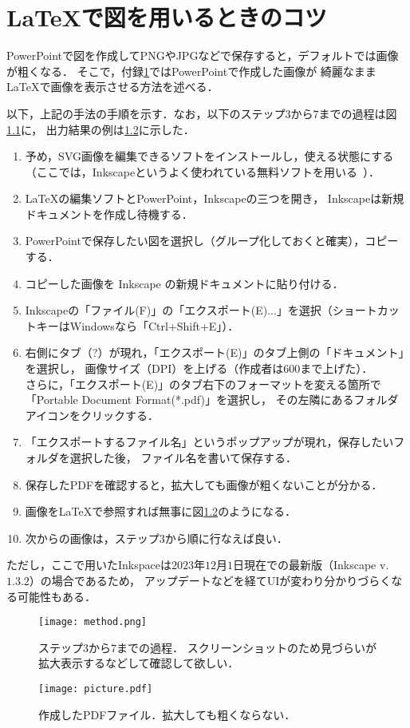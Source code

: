 \chapter{\LaTeX で図を用いるときのコツ} \label{apdx:tips}
PowerPointで図を作成してPNGやJPGなどで保存すると，デフォルトでは画像が粗くなる．
そこで，付録\ref{apdx:tips}ではPowerPointで作成した画像が
綺麗なまま\LaTeX で画像を表示させる方法を述べる．

以下，上記の手法の手順を示す．なお，以下のステップ$3$から$7$までの過程は図\ref{fig:method}に，
出力結果の例は\ref{fig:pdf}に示した．
\begin{enumerate}
    \item 予め，SVG画像を編集できるソフトをインストールし，使える状態にする
        （ここでは，Inkscapeというよく使われている無料ソフトを用いる~\cite{inkscape}）．
    \item \LaTeX の編集ソフトとPowerPoint，Inkscapeの三つを開き，
        Inkscapeは新規ドキュメントを作成し待機する．
    \item PowerPointで保存したい図を選択し（グループ化しておくと確実），コピーする．
    \item コピーした画像を Inkscape の新規ドキュメントに貼り付ける．
    \item Inkscapeの「ファイル(F)」の「エクスポート(E)...」を選択（ショートカットキーはWindowsなら「Ctrl+Shift+E」）．
    \item 右側にタブ（?）が現れ，「エクスポート(E)」のタブ上側の「ドキュメント」を選択し，
          画像サイズ（DPI）を上げる（作成者は$600$まで上げた）．\\
          さらに，「エクスポート(E)」のタブ右下のフォーマットを変える箇所で「Portable Document Format(*.pdf)」を選択し，
          その左隣にあるフォルダアイコンをクリックする．
    \item 「エクスポートするファイル名」というポップアップが現れ，保存したいフォルダを選択した後，
          ファイル名を書いて保存する．
    \item 保存したPDFを確認すると，拡大しても画像が粗くないことが分かる．
    \item 画像を\LaTeX で参照すれば無事に図\ref{fig:pdf}のようになる．
    \item 次からの画像は，ステップ$3$から順に行なえば良い．
\end{enumerate}
ただし，ここで用いたInkspaceは$2023$年$12$月$1$日現在での最新版（Inkscape v.$1.3.2$）の場合であるため，
アップデートなどを経てUIが変わり分かりづらくなる可能性もある．

\begin{figure}[h]
  \centering
  \texttt{[image: method.png]}
  \caption{ステップ$3$から$7$までの過程．
  スクリーンショットのため見づらいが拡大表示するなどして確認して欲しい．}
  \label{fig:method}
\end{figure}
\begin{figure}[h]
  \centering
  \texttt{[image: picture.pdf]}
  \caption{作成したPDFファイル．拡大しても粗くならない．}
  \label{fig:pdf}
\end{figure}
